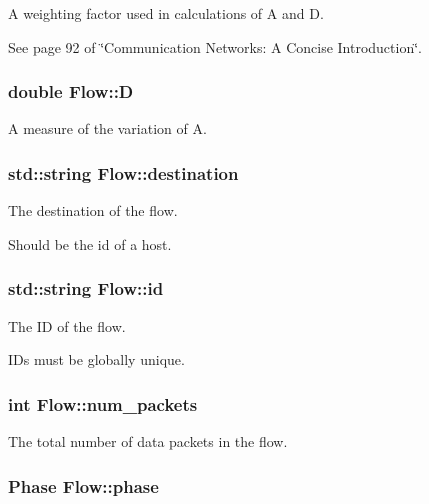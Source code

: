 \-A weighting factor used in calculations of \-A and \-D. 

\-See page 92 of \char`\"{}\-Communication Networks\-: A Concise Introduction\char`\"{}. \hypertarget{classFlow_a6ffa8765220cfbfcf8b358bcbfd8bc4d}{
\subsubsection[{\-D}]{\setlength{\rightskip}{0pt plus 5cm}double {\bf \-Flow\-::\-D}}}\label{classFlow_a6ffa8765220cfbfcf8b358bcbfd8bc4d}


\-A measure of the variation of \-A. 

\hypertarget{classFlow_a536685c38def6cf8b61d0fb0d7e8372d}{
\subsubsection[{destination}]{\setlength{\rightskip}{0pt plus 5cm}std\-::string {\bf \-Flow\-::destination}}}\label{classFlow_a536685c38def6cf8b61d0fb0d7e8372d}


\-The destination of the flow. 

\-Should be the id of a host. \hypertarget{classFlow_a8724a8f4ce94cf7bfb0db79e688ed179}{
\subsubsection[{id}]{\setlength{\rightskip}{0pt plus 5cm}std\-::string {\bf \-Flow\-::id}}}\label{classFlow_a8724a8f4ce94cf7bfb0db79e688ed179}


\-The \-I\-D of the flow. 

\-I\-Ds must be globally unique. \hypertarget{classFlow_a35a58ba8cc58bb4ae0c94eb240f53eda}{
\subsubsection[{num\-\_\-packets}]{\setlength{\rightskip}{0pt plus 5cm}int {\bf \-Flow\-::num\-\_\-packets}}}\label{classFlow_a35a58ba8cc58bb4ae0c94eb240f53eda}


\-The total number of data packets in the flow. 

\hypertarget{classFlow_a56615b49301aaddf4cab4fa3f878c5a7}{
\subsubsection[{phase}]{\setlength{\rightskip}{0pt plus 5cm}\-Phase {\bf \-Flow\-::phase}}}\label{classFlow_a56615b49301aaddf4cab4fa3f878c5a7}


